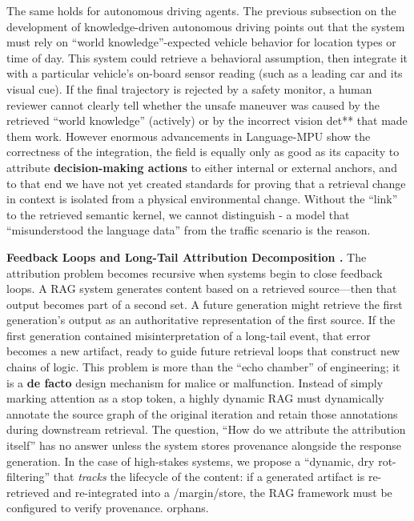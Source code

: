 \documentclass[11pt]{article}
\begin{document}
The same holds for autonomous driving agents. The previous subsection on the development of knowledge-driven autonomous driving points out that the system must rely on ``world knowledge''-expected vehicle behavior for location types or time of day. This system could retrieve a behavioral assumption, then integrate it with a particular vehicle's on-board sensor reading (such as a leading car and its visual cue). If the final trajectory is rejected by a safety monitor, a human reviewer cannot clearly tell whether the unsafe maneuver was caused by the retrieved ``world knowledge'' (actively) or by the incorrect vision det** that made them work. However enormous advancements in Language-MPU \cite{ref259} show the correctness of the integration, the field is equally only as good as its capacity to attribute \textbf{decision-making actions} to either internal or external anchors, and to that end we have not yet created standards for proving that a retrieval change in context is isolated from a physical environmental change. Without the ``link'' to the retrieved semantic kernel, we cannot distinguish - a model that ``misunderstood the language data'' from the traffic scenario is the reason.

\textbf{Feedback Loops and Long-Tail Attribution Decomposition .} The attribution problem becomes recursive when systems begin to close feedback loops. A RAG system generates content based on a retrieved source---then that output becomes part of a second set. A future generation might retrieve the first generation's output as an authoritative representation of the first source. If the first generation contained misinterpretation of a long-tail event, that error becomes a new artifact, ready to guide future retrieval loops that construct new chains of logic. This problem is more than the ``echo chamber'' of engineering; it is a \textbf{de facto} design mechanism for malice or malfunction. Instead of simply marking attention as a stop token, a highly dynamic RAG must dynamically annotate the source graph of the original iteration and retain those annotations during downstream retrieval. The question, ``How do we attribute the attribution itself'' has no answer unless the system stores provenance alongside the response generation. In the case of high-stakes systems, we propose a ``dynamic, dry rot-filtering'' that \emph{tracks} the lifecycle of the content: if a generated artifact is re-retrieved and re-integrated into a /margin/store, the RAG framework must be configured to verify provenance. orphans.
\end{document}
